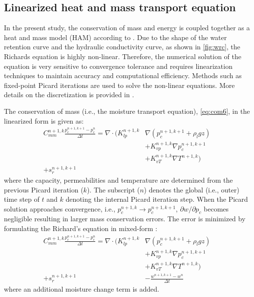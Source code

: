 \subsection{Linearized heat and mass transport equation}

In the present study, the conservation of mass and energy is coupled together as a heat and mass model (HAM) according to \citep{Janssen2002,Defraeye2011,Carmeliet2005,Saneinejad2013,Kubilay2018}. Due to the shape of the water retention curve and the hydraulic conductivity curve, as shown in \cref{fig:wrc}, the Richards equation is highly non-linear. Therefore, the numerical solution of the equation is very sensitive to convergence tolerance and requires linearization techniques to maintain accuracy and computational efficiency. Methods such as fixed-point Picard iterations are used to solve the non-linear equations. More details on the discretization is provided in \cite{Liu2012,Janssen2002,Kubilay2018}. 

The conservation of mass (i.e., the moisture transport equation), \cref{eq:com6}, in the linearized form is given as:
\begin{equation}
\begin{split}
C^{n+1,k}_{\textit{mm}}\frac{p_c^{n+1,k+1}-p_c^{n}}{\Delta t} = \nabla \cdot \Big( K_{\textit{lp}}^{n+1,k} &\nabla \left(p_c^{n+1,k+1} + \rho_l g z\right)\\
&+ K_{\textit{vp}}^{n+1,k} \nabla p_c^{n+1,k+1} \\
&+ K_{vT}^{n+1,k} \nabla T^{n+1,k}\Big)\\
+ s_r^{n+1,k+1}&
\end{split}
\end{equation}
where the capacity, permeabilities and temperature are determined from the previous Picard iteration ($k$). The subscript ($n$) denotes the global (i.e., outer) time step of $t$ and $k$ denoting the internal Picard iteration step. When the Picard solution approaches convergence, i.e., $p_c^{n+1,k} \rightarrow p_c^{n+1,k+1}$, $\partial{w}/\partial p_c$ becomes negligible resulting in larger mass conservation errors. The error is minimized by formulating the Richard's equation in mixed-form \citep{Liu2012}:
\begin{equation}
\begin{split}
C^{n+1,k}_{\textit{mm}}\frac{p_c^{n+1,k+1}-p_c^{n}}{\Delta t} = \nabla \cdot \Big( K_{\textit{lp}}^{n+1,k} &\nabla \left(p_c^{n+1,k+1} + \rho_l g z\right)\\
&+ K_{\textit{vp}}^{n+1,k} \nabla p_c^{n+1,k+1} \\
&+ K_{vT}^{n+1,k} \nabla T^{n+1,k}\Big)\\
+ s_r^{n+1,k+1} &- \frac{w^{n+1,k+1}-w^n}{\Delta t}
\end{split}
\end{equation}
where an additional moisture change term is added.

